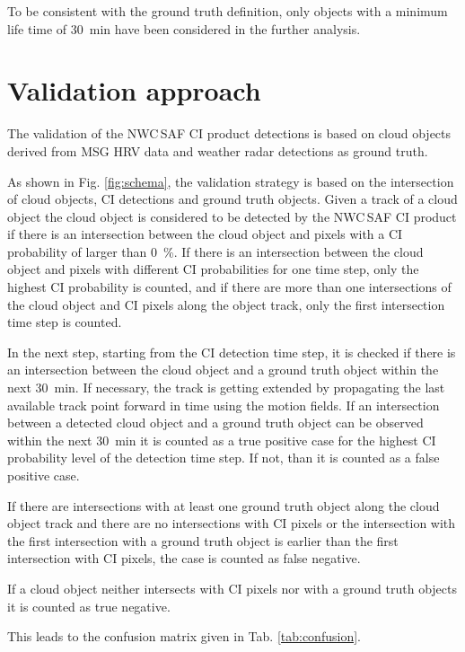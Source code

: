 To be consistent with the ground truth definition, only objects with a minimum life time of \SI{30}{\minute} have been considered in the further analysis.

\section{Validation approach}
\label{sec:validation}
The validation of the NWC\,SAF CI product detections is based on cloud objects derived from MSG HRV data and weather radar detections as ground truth.

As shown in Fig. \ref{fig:schema}, the validation strategy is based on the intersection of cloud objects, CI detections and ground truth objects. Given a track of a cloud object the cloud object is considered to be detected by the NWC\,SAF CI product if there is an intersection between the cloud object and pixels with a CI probability of larger than \SI{0}{\percent}. If there is an intersection between the cloud object and pixels with different CI probabilities for one time step, only the highest CI probability is counted, and if there are more than one intersections of the cloud object and CI pixels along the object track, only the first intersection time step is counted. 

In the next step, starting from the CI detection time step, it is checked if there is an intersection between the cloud object and a ground truth object within the next \SI{30}{\minute}. If necessary, the track is getting extended by propagating the last available track point forward in time using the motion fields. If an intersection between a detected cloud object and a ground truth object can be observed within the next \SI{30}{\minute} it is counted as a true positive case for the highest CI probability level of the detection time step. If not, than it is counted as a false positive case.

If there are intersections with at least one ground truth object along the cloud object track and there are no intersections with CI pixels or the intersection with the first intersection with a ground truth object is earlier than the first intersection with CI pixels, the case is counted as false negative.

If a cloud object neither intersects with CI pixels nor with a ground truth objects it is counted as true negative.

This leads to the confusion matrix given in Tab. \ref{tab:confusion}.

